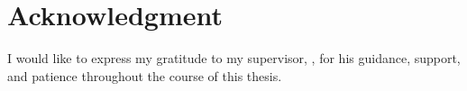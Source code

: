 \thispagestyle{empty}
\section*{Acknowledgment}

I would like to express my gratitude to my supervisor, \mySupervisor, for his guidance, support, and patience throughout the course of this thesis.

\newpage
\thispagestyle{empty}
\mbox{}
\newpage